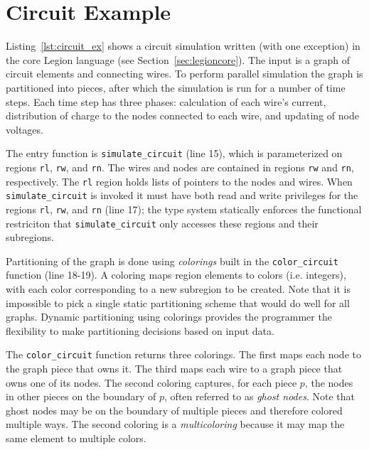 
\section{Circuit Example}
\label{sec:example}

Listing~\ref{lst:circuit_ex} shows a circuit simulation written (with
one exception) in the core Legion language (see
Section~\ref{sec:legioncore}).  The input is a graph of circuit
elements and connecting wires.  To perform parallel
simulation the graph is partitioned into pieces, after which the
simulation is run for a number of time steps.  Each time step has
three phases: calculation of each wire's current, distribution of charge to
the nodes connected to each wire, and updating of node voltages.

The entry function is {\tt simulate\_circuit} (line 15), which is
parameterized on regions {\tt rl}, {\tt rw}, and {\tt rn}.
The wires and nodes are contained in regions {\tt rw} and {\tt rn},
respectively.  The {\tt rl} region holds lists of pointers to the nodes and wires.
When {\tt simulate\_circuit} is invoked it must have both read and
write privileges for the regions {\tt rl}, {\tt rw}, and {\tt rn}
(line 17); the type system statically enforces the functional restriciton that
{\tt simulate\_circuit} only accesses these regions and their subregions.

Partitioning of the graph is done using {\em colorings} built in the
{\tt color\_circuit} function (line 18-19).  A coloring maps region
elements to colors (i.e. integers), with each color corresponding
 to a new subregion
to be created.  Note that it is impossible to pick a single static
partitioning scheme that would do well for all graphs.  Dynamic
partitioning using colorings provides the programmer the flexibility
to make partitioning decisions based on input data.

The {\tt color\_circuit} function returns three colorings.  The first
maps each node to the graph piece that owns it.
The third maps each wire to a graph piece that
owns one of its nodes.  The second coloring captures, for each piece $p$,
the nodes in other pieces on the boundary of $p$, often referred to as
{\em ghost nodes}.  
Note that 
ghost nodes may be on the boundary of multiple pieces and therefore colored
multiple ways.  The second coloring is a {\em multicoloring} because
it may map the same element to multiple colors.

